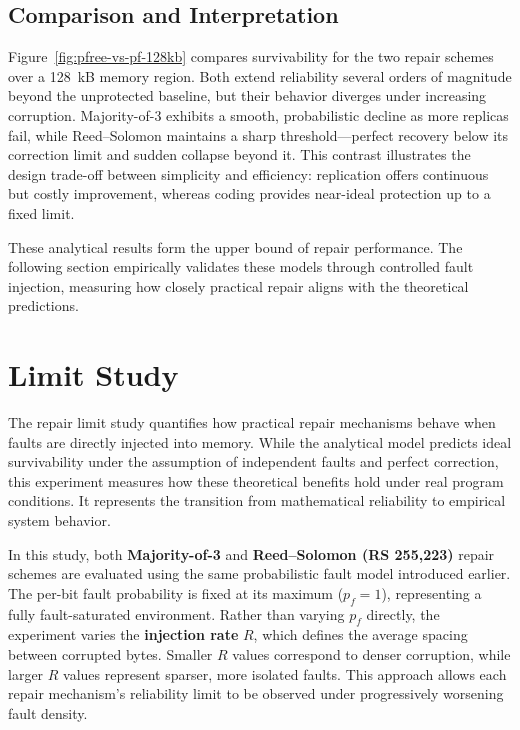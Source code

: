 \subsection{Comparison and Interpretation}

Figure~\ref{fig:pfree-vs-pf-128kb} compares survivability for the two repair schemes over a 128~kB memory region.  
Both extend reliability several orders of magnitude beyond the unprotected baseline, but their behavior diverges under increasing corruption.  
Majority-of-3 exhibits a smooth, probabilistic decline as more replicas fail, while Reed--Solomon maintains a sharp threshold—perfect recovery below its correction limit and sudden collapse beyond it.  
This contrast illustrates the design trade-off between simplicity and efficiency: replication offers continuous but costly improvement, whereas coding provides near-ideal protection up to a fixed limit.  

These analytical results form the upper bound of repair performance.  
The following section empirically validates these models through controlled fault injection, measuring how closely practical repair aligns with the theoretical predictions.

\section{Limit Study}
\label{sec:ch3-limit-study}

The repair limit study quantifies how practical repair mechanisms behave when faults are directly injected into memory.  
While the analytical model predicts ideal survivability under the assumption of independent faults and perfect correction, 
this experiment measures how these theoretical benefits hold under real program conditions.  
It represents the transition from mathematical reliability to empirical system behavior.

In this study, both \textbf{Majority-of-3} and \textbf{Reed--Solomon (RS 255,223)} repair schemes are evaluated using 
the same probabilistic fault model introduced earlier.  
The per-bit fault probability is fixed at its maximum ($p_f = 1$), representing a fully fault-saturated environment.  
Rather than varying $p_f$ directly, the experiment varies the \textbf{injection rate} $R$, which defines the average 
spacing between corrupted bytes.  
Smaller $R$ values correspond to denser corruption, while larger $R$ values represent sparser, more isolated faults.  
This approach allows each repair mechanism’s reliability limit to be observed under progressively worsening fault density.

